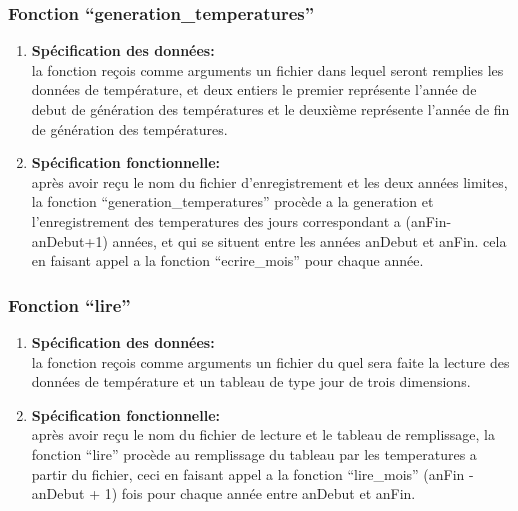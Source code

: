 \subsubsection{Fonction ``generation\_temperatures''}
\begin{enumerate}[label=\textbf{\Alph* --}]
	\item \textbf{Spécification des données: \\}
	la fonction reçois comme arguments un fichier dans lequel seront remplies les données de température, et deux entiers le premier représente l’année de debut de génération des températures et le deuxième représente l’année de fin de génération des températures.
		
    \item \textbf{Spécification fonctionnelle: \\}
    après avoir reçu le nom du fichier d’enregistrement et les deux années limites, la fonction ``generation\_temperatures''
     procède a la generation et l’enregistrement des temperatures des jours correspondant a (anFin-anDebut+1) années, et qui se situent entre les années anDebut et anFin. cela en faisant appel a la fonction ``ecrire\_mois'' pour chaque année.

\end{enumerate}	


\subsubsection{Fonction ``lire''}
\begin{enumerate}[label=\textbf{\Alph* --}]
	\item \textbf{Spécification des données: \\}
	la fonction reçois comme arguments un fichier du quel sera faite la lecture des données de température et un tableau de type jour de trois dimensions.
		
    \item \textbf{Spécification fonctionnelle: \\}
    après avoir reçu le nom du fichier de lecture et le tableau de remplissage, la fonction ``lire'' procède au remplissage du tableau par les temperatures a partir du fichier, ceci en faisant appel a la fonction ``lire\_mois''
     (anFin - anDebut + 1) fois  pour chaque année entre anDebut et anFin. 
\end{enumerate}	

